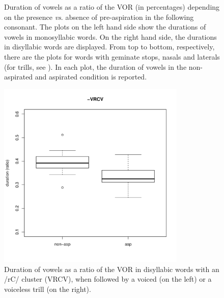 \documentclass[11pt,a4paper,openany]{memoir}\usepackage[]{graphicx}\usepackage[]{color}
\newenvironment{knitrout}{}{} %
\begin{document}
\begin{figure}
\begin{subfigure}{.5\textwidth}
\begin{knitrout}
\end{knitrout}
\end{subfigure}
\caption[Duration of vowels as a ratio of the VOR (in percentages) depending on the presence \textit{vs}. absence of pre-aspiration in the following consonant.]{\scriptsize Duration of vowels as a ratio of the VOR (in percentages) depending on the presence \textit{vs}. absence of pre-aspiration in the following consonant.
The plots on the left hand side show the durations of vowels in monosyllabic words.
On the right hand side, the durations in disyllabic words are displayed.
From top to bottom, respectively, there are the plots for words with geminate stops, nasals and laterals (for trills, see ).
In each plot, the duration of vowels in the non-aspirated and aspirated condition is reported.
}
\label{f:vowelduration}
\end{figure}

\begin{figure}
\centering
\begin{knitrout}
\color{fgcolor}
\includegraphics[width=0.8\textwidth]{img/di-rho-box-1} 

\end{knitrout}
\caption[Duration of vowels as a ratio of the VOR in disyllabic words with an /rC/ cluster (VRCV).]{Duration of vowels as a ratio of the VOR in disyllabic words with an /rC/ cluster (VRCV), when followed by a voiced (on the left) or a voiceless trill (on the right).}
\label{f:voweldurrho}
\end{figure}
\end{document}
